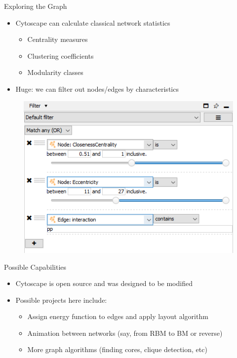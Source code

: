 \documentclass{beamer}
\begin{document}
\begin{frame}{Exploring the Graph}
  \begin{itemize}
    \item Cytoscape can calculate classical network statistics
    \begin{itemize}
      \item Centrality measures
      \item Clustering coefficients
      \item Modularity classes
    \end{itemize}
    \item Huge: we can filter out nodes/edges by characteristics
  \end{itemize}
  \begin{figure}
    \begin{center}
      \includegraphics[width=.65\textwidth]{cytofilter.png}
    \end{center}
  \end{figure}
\end{frame}

\begin{frame}{Possible Capabilities}
  \begin{itemize}
    \item Cytoscape is open source and was designed to be modified
    \item Possible projects here include:
    \begin{itemize}
      \item Assign energy function to edges and apply layout algorithm
      \item Animation between networks (say, from RBM to BM or reverse)
      \item More graph algorithms (finding cores, clique detection, etc)
    \end{itemize}
  \end{itemize}
  
\end{frame}
\end{document}
